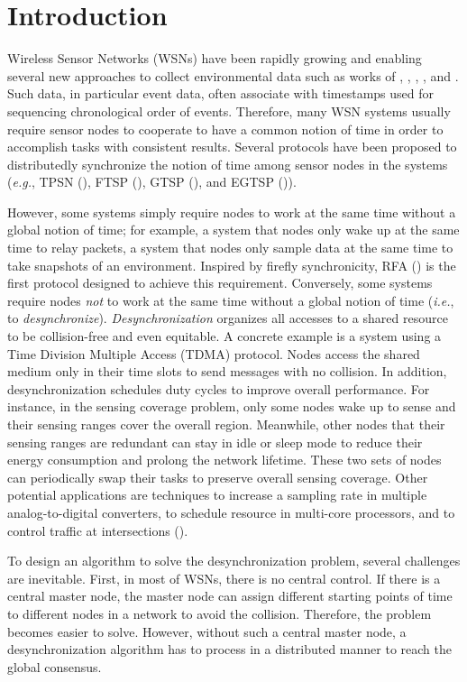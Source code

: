 \chapter{Introduction}
Wireless Sensor Networks (WSNs)  have been rapidly growing and enabling several new approaches to collect environmental data such as works of \cite{habitat}, \cite{surveillance}, \cite{structure}, \cite{energy}, and \cite{senvm}.
Such data, in particular event data, often associate with timestamps used for  sequencing chronological  order of events.
Therefore, many WSN systems usually require sensor nodes to cooperate to have a common notion of time in order to accomplish tasks with consistent results.
Several protocols have been proposed to distributedly synchronize the notion of time among sensor nodes in the systems (\textit{e.g.}, TPSN (\cite{Ganeriwal:2003:TPS:958491.958508}), FTSP (\cite{Maroti:2004:FTS:1031495.1031501}), GTSP (\cite{5211944}), and EGTSP (\cite{5614702})).

 However, some systems simply require nodes to work at the same time without a global notion of time; for example, a system that nodes only wake up at the same time to relay packets,
 a system that nodes only sample data at the same time to take snapshots of an environment.
 Inspired by firefly synchronicity, RFA (\cite{Werner-Allen}) is the first protocol designed to achieve this requirement. 
 Conversely, some systems require nodes \textit{not} to work at the same time without a global notion of time (\textit{i.e.}, to \textit{desynchronize}).
\textit{Desynchronization} organizes all accesses to a shared resource to be collision-free and even equitable.
A concrete example is a system using a Time Division Multiple Access (TDMA) protocol. 
Nodes access the shared medium only in their time slots to send messages with no collision.
In addition, desynchronization schedules duty cycles to improve overall performance.
For instance, in the sensing coverage problem, only some nodes wake up to sense and their sensing ranges cover the overall region.
Meanwhile, other nodes that their sensing ranges are redundant can stay in idle or sleep mode to reduce their energy consumption and prolong the network lifetime.   
These two sets of nodes can periodically swap their tasks to preserve overall sensing coverage.
Other potential applications are techniques to increase a sampling rate in multiple analog-to-digital converters, to
schedule resource in multi-core processors, and to control traffic at intersections (\cite{4274893}). 

To design an algorithm to solve the desynchronization problem, several challenges are inevitable.
First, in most of WSNs, there is no central control. 
If there is a central master node, the master node can assign different starting points of time to different nodes in a network to avoid the collision.
Therefore, the problem becomes easier to solve.
However, without such a central master node, a desynchronization algorithm  has to process in a distributed manner to reach the global consensus.

